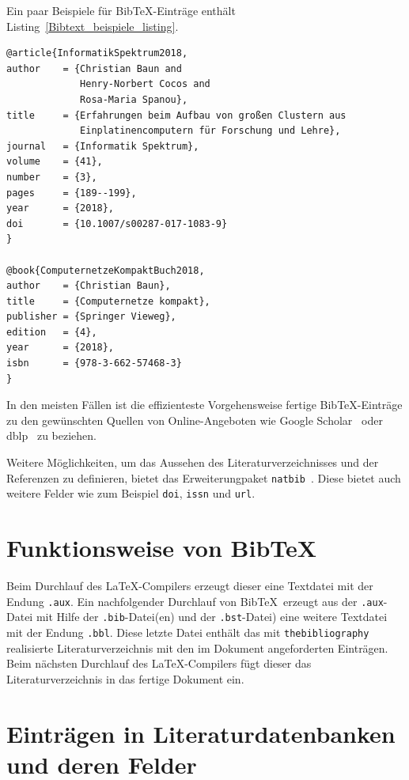 \documentclass[a4paper,10pt,twoside]{scrbook}
\begin{document}
{Ein paar Beispiele für Bib\TeX-Einträge enthält Listing~\ref{Bibtext_beispiele_listing}.


\begin{lstlisting}[caption={Einige Beispeile für Bib\TeX-Einträge},label=Bibtext_beispiele_listing, style=customlatex]
@article{InformatikSpektrum2018,
author    = {Christian Baun and
             Henry-Norbert Cocos and
             Rosa-Maria Spanou},
title     = {Erfahrungen beim Aufbau von großen Clustern aus
             Einplatinencomputern für Forschung und Lehre},
journal   = {Informatik Spektrum},
volume    = {41},
number    = {3},
pages     = {189--199},
year      = {2018},
doi       = {10.1007/s00287-017-1083-9}
}

@book{ComputernetzeKompaktBuch2018,
author    = {Christian Baun},
title     = {Computernetze kompakt},
publisher = {Springer Vieweg},
edition   = {4},
year      = {2018},
isbn      = {978-3-662-57468-3}
}
\end{lstlisting}


In den meisten Fällen ist die effizienteste Vorgehensweise fertige Bib\TeX-Einträge zu den gewünschten Quellen von Online-Angeboten wie Google Scholar~\cite{GoogleScholarWebseite} oder dblp~\cite{DBLPWebseite} zu beziehen.

Weitere Möglichkeiten, um das Aussehen des Literaturverzeichnisses und der Referenzen zu definieren, bietet das Erweiterungpaket \verb|natbib|~\cite{natbibDoku}. Diese bietet auch weitere Felder wie zum Beispiel \texttt{doi}, \texttt{issn} und \texttt{url}.


\section{Funktionsweise von Bib\TeX}
\label{Abschnitt_Funktionsweise_Bibtex}

Beim Durchlauf des \LaTeX-Compilers erzeugt dieser eine Textdatei mit der Endung \verb|.aux|. Ein nachfolgender Durchlauf von Bib\TeX\ erzeugt aus der \verb|.aux|-Datei mit Hilfe der \verb|.bib|-Datei(en) und der \verb|.bst|-Datei) eine weitere Textdatei mit der Endung \verb|.bbl|. Diese letzte Datei enthält das mit \verb|thebibliography| realisierte Literaturverzeichnis mit den im Dokument angeforderten Einträgen. Beim nächsten Durchlauf des \LaTeX-Compilers fügt dieser das Literaturverzeichnis in das fertige Dokument ein.




\section{Einträgen in Literaturdatenbanken und deren Felder}
\label{Abschnitt_Eintraege_Bibtex_Felder}

}
\end{document}

